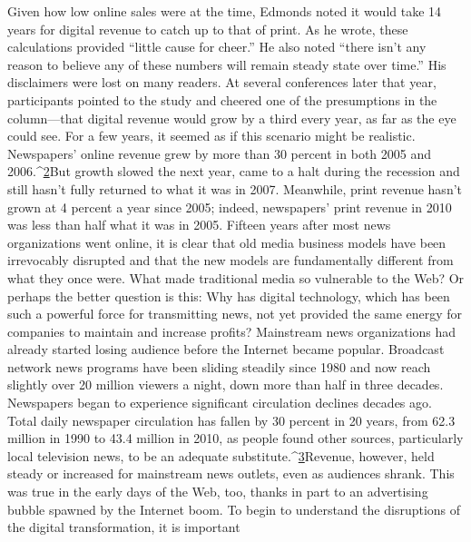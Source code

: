 
Given how low online sales were at the time, Edmonds noted it would take 14
years for digital revenue to catch up to that of print. As he wrote, these calculations
provided ``little cause for cheer.'' He also noted ``there isn't any reason to
believe any of these numbers will remain steady state over time.''
His disclaimers were lost on many readers. At several conferences later that
year, participants pointed to the study and cheered one of the presumptions in
the column—that digital revenue would grow by a third every year, as far as the
eye could see.
For a few years, it seemed as if this scenario might be realistic. Newspapers'
online revenue grew by more than 30 percent in both 2005 and 2006.^{\href{#endnotes-chapter-1}{2}}But
growth slowed the next year, came to a halt during the recession and still hasn't
fully returned to what it was in 2007. Meanwhile, print revenue hasn't grown at
4 percent a year since 2005; indeed, newspapers' print revenue in 2010 was less
than half what it was in 2005.
Fifteen years after most news organizations went online, it is clear that old media
business models have been irrevocably disrupted and that the new models are
fundamentally different from what they once were. What made traditional media
so vulnerable to the Web? Or perhaps the better question is this: Why has digital
technology, which has been such a powerful force for transmitting news, not yet
provided the same energy for companies to maintain and increase profits?
Mainstream news organizations had already started losing audience before
the Internet became popular. Broadcast network news programs have been
sliding steadily since 1980 and now reach slightly over 20 million viewers a
night, down more than half in three decades. Newspapers began to experience
significant circulation declines decades ago. Total daily newspaper circulation
has fallen by 30 percent in 20 years, from 62.3 million in 1990 to 43.4 million
in 2010, as people found other sources, particularly local television news, to be
an adequate substitute.^{\href{#endnotes-chapter-1}{3}}Revenue, however, held steady or increased for mainstream news outlets, even
as audiences shrank. This was true in the early days of the Web, too, thanks in part
to an advertising bubble spawned by the Internet boom.
To begin to understand the disruptions of the digital transformation, it is important
